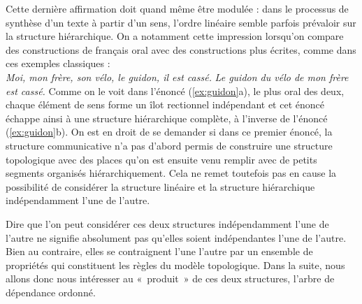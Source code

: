 {    Cette dernière affirmation doit quand même être modulée : dans le processus de synthèse d’un texte à partir d’un sens, l’ordre linéaire semble parfois prévaloir sur la structure hiérarchique. On a notamment cette impression lorsqu’on compare des constructions de français oral avec des constructions plus écrites, comme dans ces exemples classiques :\\
    \ea\label{ex:guidon}
    \ea  \textit{Moi, mon frère, son vélo, le guidon, il est cassé.}
    \ex  \textit{Le guidon du vélo de mon frère est cassé.}
    \z
    \z
    Comme on le voit dans l'énoncé (\ref{ex:guidon}a), le plus oral des deux, chaque élément de sens forme un îlot rectionnel indépendant et cet énoncé échappe ainsi à une structure hiérarchique complète, à l’inverse de l'énoncé (\ref{ex:guidon}b). On est en droit de se demander si dans ce premier énoncé, la structure communicative n’a pas d’abord permis de construire une structure topologique avec des places qu’on est ensuite venu remplir avec de petits segments organisés hiérarchiquement. Cela ne remet toutefois pas en cause la possibilité de considérer la structure linéaire et la structure hiérarchique indépendamment l’une de l’autre.

    Dire que l’on peut considérer ces deux structures indépendamment l’une de l’autre ne signifie absolument pas qu’elles soient indépendantes l’une de l’autre. Bien au contraire, elles se contraignent l’une l’autre par un ensemble de propriétés qui constituent les règles du modèle topologique. Dans la suite, nous allons donc nous intéresser au «~produit~» de ces deux structures, l’arbre de dépendance ordonné.
}
\pagebreak\largerpage
